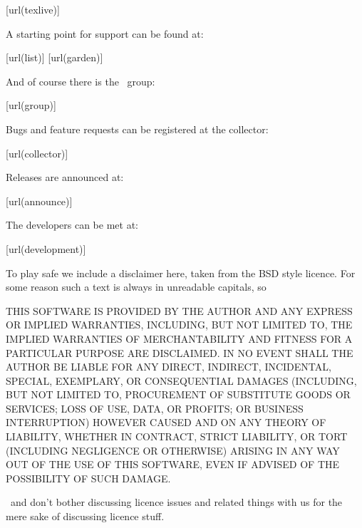 \startlines
\goto{\url[texlive]}[url(texlive)]
\stoplines

A starting point for support can be found at:

\startlines
\goto{\url[list]}[url(list)]
\goto{\url[garden]}[url(garden)]
\stoplines

And of course there is the \CONTEXT\ group:

\startlines
\goto{\url[group]}[url(group)]
\stoplines

Bugs and feature requests can be registered at the collector:

\startlines
\goto{\url[collector]}[url(collector)]
\stoplines

Releases are announced at:

\startlines
\goto{\url[announce]}[url(announce)]
\stoplines

The developers can be met at:

\startlines
\goto{\url[development]}[url(development)]
\stoplines

\stopsubject

\startsubject[title={Disclaimer}]

To play safe we include a disclaimer here, taken from the BSD style licence. For
some reason such a text is always in unreadable capitals, so \unknown

\start \txx \blue
THIS SOFTWARE IS PROVIDED BY THE AUTHOR  AND ANY EXPRESS OR
IMPLIED WARRANTIES, INCLUDING, BUT NOT LIMITED TO, THE IMPLIED WARRANTIES
OF MERCHANTABILITY AND FITNESS FOR A PARTICULAR PURPOSE ARE DISCLAIMED.
IN NO EVENT SHALL THE AUTHOR BE LIABLE FOR ANY DIRECT, INDIRECT,
INCIDENTAL, SPECIAL, EXEMPLARY, OR CONSEQUENTIAL DAMAGES (INCLUDING, BUT
NOT LIMITED TO, PROCUREMENT OF SUBSTITUTE GOODS OR SERVICES; LOSS OF USE,
DATA, OR PROFITS; OR BUSINESS INTERRUPTION) HOWEVER CAUSED AND ON ANY
THEORY OF LIABILITY, WHETHER IN CONTRACT, STRICT LIABILITY, OR TORT
(INCLUDING NEGLIGENCE OR OTHERWISE) ARISING IN ANY WAY OUT OF THE USE OF
THIS SOFTWARE, EVEN IF ADVISED OF THE POSSIBILITY OF SUCH DAMAGE.
\stop

\unknown\ and don't bother discussing licence issues and related things with us
for the mere sake of discussing licence stuff.

\stopsubject

\stopdocument
